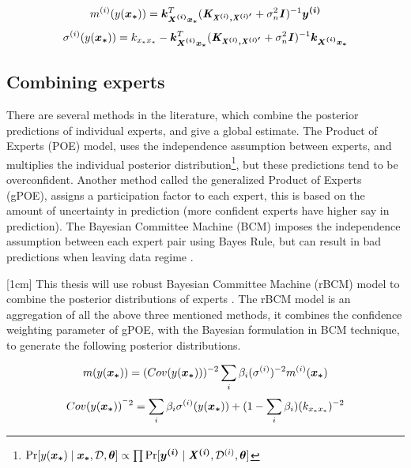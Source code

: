 \begin{equation}\label{eqPredictiveMeanIndividualExpert}
  m^{(i)}(y(\boldsymbol{x_{*}})) = \boldsymbol{k_{X^{(i)}x_{*}}}^{T}( \bm{\mathit{K_{X^{(i)}, X^{(i)'}}}} + \sigma^{2}_{n}\bm{\mathit{I}})^{-1} \boldsymbol{y^{(i)}}
  \end{equation}
\begin{equation}\label{eqPredictiveCovarianceIndividualExpert}
	\sigma^{(i)}(y(\boldsymbol{x_{*}})) = k_{x_{*}x_{*}} - \boldsymbol{k_{X^{(i)}x_{*}}}^{T}( \bm{\mathit{K_{X^{(i)}, X^{(i)'}}}} + \sigma^{2}_{n}\bm{\mathit{I}} )^{-1} \boldsymbol{k_{X^{(i)}x_{*}}}
  \end{equation}

\subsection{Combining experts}\label{subSecCombiningExperts}
There are several methods in the literature, which combine the posterior predictions of individual experts, and give a global estimate. The Product of Experts (POE) model, uses the independence assumption between experts, and multiplies the individual posterior distribution\footnote{$\Pr[y(\boldsymbol{x_{*}}) \mid \boldsymbol{x_{*}}, \mathcal{D}, \boldsymbol{\theta}] \propto \prod \Pr[\boldsymbol{y^{(i)}} \mid \bm{\mathit{X^{(i)}}}, \mathcal{D}^{(i)}, \boldsymbol{\theta}]$}, but these predictions tend to be overconfident. Another method called the generalized Product of Experts (gPOE), assigns a participation factor to each expert, this is based on the amount of uncertainty in prediction (more confident experts have higher say in prediction)\cite{caoF14}. The Bayesian Committee Machine (BCM) imposes the independence assumption between each expert pair using Bayes Rule, but can result in bad predictions when leaving data regime \cite{tresp2000bayesian}. 

[1cm]
This thesis will use robust Bayesian Committee Machine (rBCM) model to combine the posterior distributions of experts \cite{deisenroth2015distributed}. The rBCM model is an aggregation of all the above three mentioned methods, it combines the confidence weighting parameter of gPOE, with the Bayesian formulation in BCM technique, to generate the following posterior distributions.

\begin{equation}\label{eqMeanDGP}
    m(y(\boldsymbol{x_{*}})) = (Cov(y(\boldsymbol{x_{*}})))^{-2}\sum_{i} \beta_{i}(\sigma^{(i)})^{-2}m^{(i)}(\boldsymbol{x_{*}})
\end{equation}
\begin{equation}\label{eqCovarianceDGP}
    Cov(y(\boldsymbol{x_{*}}))^{^-2} = \sum_{i} \beta_{i}\sigma^{(i)}(y(\boldsymbol{x_{*}})) + (1- \sum_{i} \beta_{i})(k_{x_{*}x_{*}})^{-2}
\end{equation}

